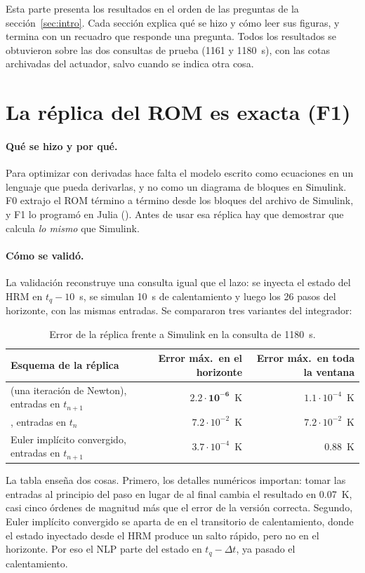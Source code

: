 \noindent Esta parte presenta los resultados en el orden de las preguntas de la
sección~\ref{sec:intro}. Cada sección explica qué se hizo y cómo leer sus figuras, y termina con
un recuadro que responde una pregunta. Todos los resultados se obtuvieron sobre las dos
consultas de prueba (1161 y 1180~s), con las cotas archivadas del actuador, salvo cuando se
indica otra cosa.

\section{La réplica del ROM es exacta (F1)}\label{sec:replica}
\paragraph{Qué se hizo y por qué.} Para optimizar con derivadas hace falta el modelo escrito
como ecuaciones en un lenguaje que pueda derivarlas, y no como un diagrama de bloques en
Simulink. F0 extrajo el ROM término a término desde los bloques del archivo de Simulink, y F1 lo
programó en Julia (). Antes de usar esa réplica hay que demostrar que
calcula \emph{lo mismo} que Simulink.

\paragraph{Cómo se validó.} La validación reconstruye una consulta igual que el lazo: se inyecta
el estado del HRM en $t_q-10$~s, se simulan 10~s de calentamiento y luego los 26 pasos del
horizonte, con las mismas entradas. Se compararon tres variantes del integrador:

\begin{table}[H]\centering\small
\begin{tabularx}{\linewidth}{@{}Y r r@{}}\toprule
Esquema de la réplica & Error máx.\ en el horizonte & Error máx.\ en toda la ventana\\\midrule
{} (una iteración de Newton), entradas en $t_{n+1}$ & $\mathbf{2.2\cdot10^{-6}}$~K & $1.1\cdot10^{-4}$~K\\
, entradas en $t_n$ & $7.2\cdot10^{-2}$~K & $7.2\cdot10^{-2}$~K\\
Euler implícito convergido, entradas en $t_{n+1}$ & $3.7\cdot10^{-4}$~K & 0.88~K\\\bottomrule
\end{tabularx}
\caption{Error de la réplica frente a Simulink en la consulta de 1180~s.}
\end{table}
\noindent La tabla enseña dos cosas. Primero, los detalles numéricos importan: tomar las entradas
al principio del paso en lugar de al final cambia el resultado en 0.07~K, casi cinco órdenes de
magnitud más que el error de la versión correcta. Segundo, Euler implícito convergido se aparta
de  en el transitorio de calentamiento, donde el estado inyectado desde el HRM
produce un salto rápido, pero no en el horizonte. Por eso el NLP parte del estado en
$t_q-\Delta t$, ya pasado el calentamiento.

